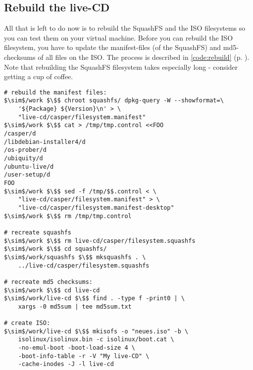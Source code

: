 \subsection{Rebuild the live-CD}
All that is left to do now is to rebuild the SquashFS and the ISO filesystems so
you can test them on your virtual machine. Before you can rebuild the ISO
filesystem, you have to update the manifest-files (of the SquashFS) and
md5-checksums of all files on the ISO. The process is described in \lstlistingname{}
\ref{code:rebuild} (p. \pageref{code:rebuild}). Note that rebuilding the SquashFS
filesystem takes especially long - consider getting a cup of coffee.

\begin{lstlisting}[caption={Rebuiling the live-CD},float=ht,label={code:rebuild}]
# rebuild the manifest files:
$\sim$/work $\$$ chroot squashfs/ dpkg-query -W --showformat=\
	'${Package} ${Version}\n' > \
	"live-cd/casper/filesystem.manifest"
$\sim$/work $\$$ cat > /tmp/tmp.control <<FOO
/casper/d
/libdebian-installer4/d
/os-prober/d
/ubiquity/d
/ubuntu-live/d
/user-setup/d
FOO 
$\sim$/work $\$$ sed -f /tmp/$$.control < \
	"live-cd/casper/filesystem.manifest" > \
	"live-cd/casper/filesystem.manifest-desktop"
$\sim$/work $\$$ rm /tmp/tmp.control

# recreate squashfs
$\sim$/work $\$$ rm live-cd/casper/filesystem.squashfs
$\sim$/work $\$$ cd squashfs/
$\sim$/work/squashfs $\$$ mksquashfs . \
	../live-cd/casper/filesystem.squashfs

# recreate md5 checksums:
$\sim$/work $\$$ cd live-cd
$\sim$/work/live-cd $\$$ find . -type f -print0 | \
	xargs -0 md5sum | tee md5sum.txt

# create ISO:
$\sim$/work/live-cd $\$$ mkisofs -o "neues.iso" -b \
	isolinux/isolinux.bin -c isolinux/boot.cat \
	-no-emul-boot -boot-load-size 4 \
	-boot-info-table -r -V "My live-CD" \
	-cache-inodes -J -l live-cd
\end{lstlisting}
